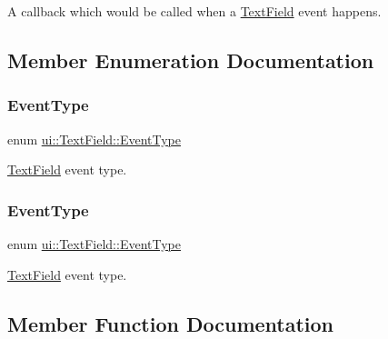 A callback which would be called when a \hyperlink{classui_1_1TextField}{Text\+Field} event happens. 

\subsection{Member Enumeration Documentation}
\mbox{\label{classui_1_1TextField_aaa8ec638be6efea053beb57e5382ade9}} 
\subsubsection{\texorpdfstring{Event\+Type}{EventType}\hspace{0.1cm}{\footnotesize\ttfamily [1/2]}}
{\footnotesize\ttfamily enum \hyperlink{classui_1_1TextField_aaa8ec638be6efea053beb57e5382ade9}{ui\+::\+Text\+Field\+::\+Event\+Type}\hspace{0.3cm}{\ttfamily [strong]}}

\hyperlink{classui_1_1TextField}{Text\+Field} event type. \mbox{\label{classui_1_1TextField_aaa8ec638be6efea053beb57e5382ade9}} 
\subsubsection{\texorpdfstring{Event\+Type}{EventType}\hspace{0.1cm}{\footnotesize\ttfamily [2/2]}}
{\footnotesize\ttfamily enum \hyperlink{classui_1_1TextField_aaa8ec638be6efea053beb57e5382ade9}{ui\+::\+Text\+Field\+::\+Event\+Type}\hspace{0.3cm}{\ttfamily [strong]}}

\hyperlink{classui_1_1TextField}{Text\+Field} event type. 

\subsection{Member Function Documentation}
\mbox{\label{classui_1_1TextField_a2fb48806ef4efd12c4d7db8f58956509}} 
